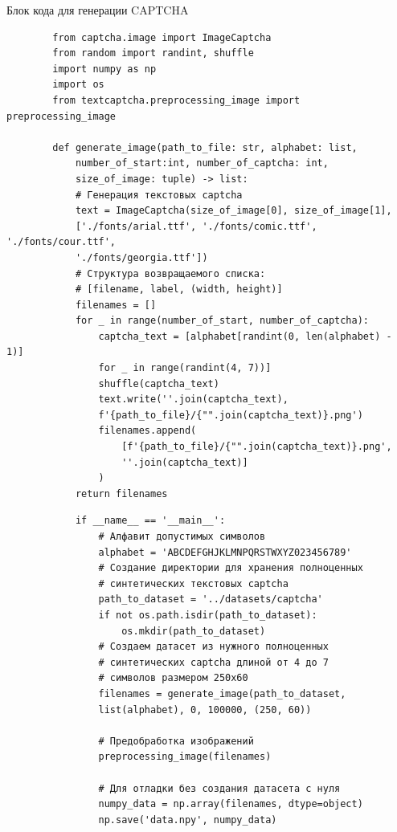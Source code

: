 \documentclass[12pt,a4paper,mathserif]{beamer}
\begin{document}
\begin{frame}[fragile]{{Блок кода для генерации CAPTCHA}}
    \begin{adjustbox}{width=\textwidth,height=\someheight,keepaspectratio}
    \begin{minipage}{1.1\linewidth}
    \begin{verbatim}
        from captcha.image import ImageCaptcha
        from random import randint, shuffle
        import numpy as np
        import os
        from textcaptcha.preprocessing_image import preprocessing_image
        
        def generate_image(path_to_file: str, alphabet: list,
            number_of_start:int, number_of_captcha: int,
            size_of_image: tuple) -> list:
            # Генерация текстовых captcha
            text = ImageCaptcha(size_of_image[0], size_of_image[1],
            ['./fonts/arial.ttf', './fonts/comic.ttf', './fonts/cour.ttf',
            './fonts/georgia.ttf'])
            # Структура возвращаемого списка:
            # [filename, label, (width, height)]
            filenames = []
            for _ in range(number_of_start, number_of_captcha):
                captcha_text = [alphabet[randint(0, len(alphabet) - 1)]
                for _ in range(randint(4, 7))]
                shuffle(captcha_text)
                text.write(''.join(captcha_text),
                f'{path_to_file}/{"".join(captcha_text)}.png')
                filenames.append(
                    [f'{path_to_file}/{"".join(captcha_text)}.png',
                    ''.join(captcha_text)]
                )
            return filenames
    \end{verbatim}
    \end{minipage}
    \hfill
    \begin{minipage}{1.1\linewidth}
    \begin{verbatim}
            if __name__ == '__main__':
                # Алфавит допустимых символов
                alphabet = 'ABCDEFGHJKLMNPQRSTWXYZ023456789'
                # Создание директории для хранения полноценных
                # синтетических текстовых captcha
                path_to_dataset = '../datasets/captcha'
                if not os.path.isdir(path_to_dataset):
                    os.mkdir(path_to_dataset)
                # Создаем датасет из нужного полноценных
                # синтетических captcha длиной от 4 до 7
                # символов размером 250х60
                filenames = generate_image(path_to_dataset,
                list(alphabet), 0, 100000, (250, 60))
            
                # Предобработка изображений
                preprocessing_image(filenames)
            
                # Для отладки без создания датасета с нуля
                numpy_data = np.array(filenames, dtype=object)
                np.save('data.npy', numpy_data)
    \end{verbatim}
    \end{minipage}
    \end{adjustbox}
\end{frame}
\end{document}
